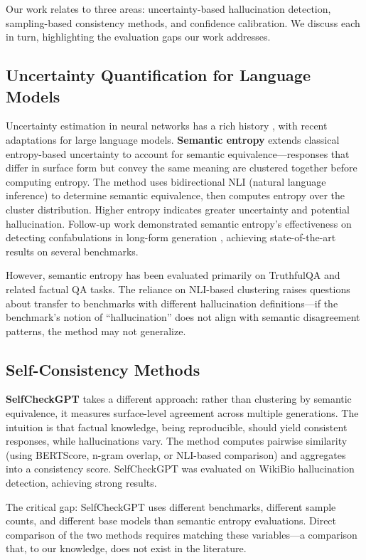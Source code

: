 Our work relates to three areas: uncertainty-based hallucination detection, sampling-based consistency methods, and confidence calibration. We discuss each in turn, highlighting the evaluation gaps our work addresses.

\subsection{Uncertainty Quantification for Language Models}

Uncertainty estimation in neural networks has a rich history \citep{gal2016dropout}, with recent adaptations for large language models. \textbf{Semantic entropy} \citep{kuhn2023semantic} extends classical entropy-based uncertainty to account for semantic equivalence---responses that differ in surface form but convey the same meaning are clustered together before computing entropy. The method uses bidirectional NLI (natural language inference) to determine semantic equivalence, then computes entropy over the cluster distribution. Higher entropy indicates greater uncertainty and potential hallucination. Follow-up work demonstrated semantic entropy's effectiveness on detecting confabulations in long-form generation \citep{farquhar2024detecting}, achieving state-of-the-art results on several benchmarks.

However, semantic entropy has been evaluated primarily on TruthfulQA and related factual QA tasks. The reliance on NLI-based clustering raises questions about transfer to benchmarks with different hallucination definitions---if the benchmark's notion of ``hallucination'' does not align with semantic disagreement patterns, the method may not generalize.

\subsection{Self-Consistency Methods}

\textbf{SelfCheckGPT} \citep{manakul2023selfcheckgpt} takes a different approach: rather than clustering by semantic equivalence, it measures surface-level agreement across multiple generations. The intuition is that factual knowledge, being reproducible, should yield consistent responses, while hallucinations vary. The method computes pairwise similarity (using BERTScore, n-gram overlap, or NLI-based comparison) and aggregates into a consistency score. SelfCheckGPT was evaluated on WikiBio hallucination detection, achieving strong results.

The critical gap: SelfCheckGPT uses different benchmarks, different sample counts, and different base models than semantic entropy evaluations. Direct comparison of the two methods requires matching these variables---a comparison that, to our knowledge, does not exist in the literature.

